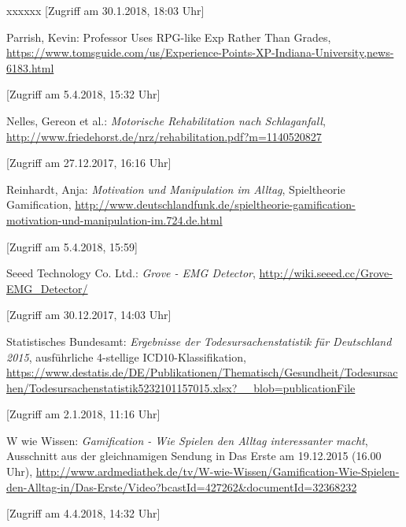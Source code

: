 \begin{thebibliography}{xxxxxx}
[Zugriff am 30.1.2018, 18:03 Uhr]

 Parrish, Kevin: Professor Uses RPG-like Exp Rather Than Grades, \url{https://www.tomsguide.com/us/Experience-Points-XP-Indiana-University,news-6183.html}

[Zugriff am 5.4.2018, 15:32 Uhr]

 Nelles, Gereon et al.: \textit{Motorische Rehabilitation nach Schlaganfall}, \url{http://www.friedehorst.de/nrz/rehabilitation.pdf?m=1140520827}

[Zugriff am 27.12.2017, 16:16 Uhr]

 Reinhardt, Anja: \textit{Motivation und Manipulation im Alltag}, Spieltheorie \glqq Gamification\grqq , \url{http://www.deutschlandfunk.de/spieltheorie-gamification-motivation-und-manipulation-im.724.de.html}

[Zugriff am 5.4.2018, 15:59]

 Seeed Technology Co. Ltd.: \textit{Grove - EMG Detector}, \url{http://wiki.seeed.cc/Grove-EMG_Detector/}

[Zugriff am 30.12.2017, 14:03 Uhr]

 Statistisches Bundesamt: \textit{Ergebnisse der Todesursachenstatistik für Deutschland 2015}, ausführliche 4-stellige ICD10-Klassifikation, \\ \url{https://www.destatis.de/DE/Publikationen/Thematisch/Gesundheit/Todesursachen/Todesursachenstatistik5232101157015.xlsx?__blob=publicationFile}

[Zugriff am 2.1.2018, 11:16 Uhr]

 W wie Wissen: \textit{Gamification - Wie Spielen den Alltag interessanter macht}, Ausschnitt aus der gleichnamigen Sendung in Das Erste am 19.12.2015 (16.00 Uhr), \url{http://www.ardmediathek.de/tv/W-wie-Wissen/Gamification-Wie-Spielen-den-Alltag-in/Das-Erste/Video?bcastId=427262&documentId=32368232}

[Zugriff am 4.4.2018, 14:32 Uhr]
\end{thebibliography}
